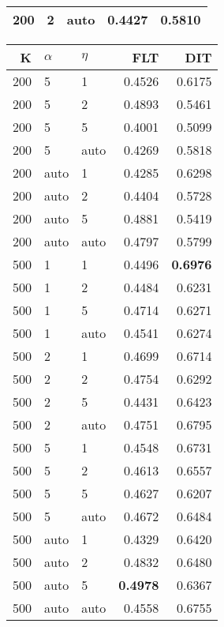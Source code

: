 \begin{table}
\begin{spacing}{1.2}
{\begin{tabular}{rll|rr}
 200 &     2 &  auto &           0.4427 & 0.5810 \\
\bottomrule
\end{tabular}
} \hfill \parbox{.45\linewidth}{\centering \begin{tabular}{rll|rr}
\toprule
   K & $\alpha$ &   $\eta$ & FLT &       DIT \\
\midrule
 200 &     5 &     1 &           0.4526 &       0.6175 \\
 200 &     5 &     2 &           0.4893 &       0.5461 \\
 200 &     5 &     5 &           0.4001 &       0.5099 \\
 200 &     5 &  auto &           0.4269 &       0.5818 \\
 200 &  auto &     1 &           0.4285 &       0.6298 \\
 200 &  auto &     2 &           0.4404 &       0.5728 \\
 200 &  auto &     5 &           0.4881 &       0.5419 \\
 200 &  auto &  auto &           0.4797 &       0.5799 \\
 500 &     1 &     1 &           0.4496 & {\bf 0.6976} \\
 500 &     1 &     2 &           0.4484 &       0.6231 \\
 500 &     1 &     5 &           0.4714 &       0.6271 \\
 500 &     1 &  auto &           0.4541 &       0.6274 \\
 500 &     2 &     1 &           0.4699 &       0.6714 \\
 500 &     2 &     2 &           0.4754 &       0.6292 \\
 500 &     2 &     5 &           0.4431 &       0.6423 \\
 500 &     2 &  auto &           0.4751 &       0.6795 \\
 500 &     5 &     1 &           0.4548 &       0.6731 \\
 500 &     5 &     2 &           0.4613 &       0.6557 \\
 500 &     5 &     5 &           0.4627 &       0.6207 \\
 500 &     5 &  auto &           0.4672 &       0.6484 \\
 500 &  auto &     1 &           0.4329 &       0.6420 \\
 500 &  auto &     2 &           0.4832 &       0.6480 \\
 500 &  auto &     5 &     {\bf 0.4978} &       0.6367 \\
 500 &  auto &  auto &           0.4558 &       0.6755 \\
\bottomrule
\end{tabular}
}
\end{spacing}
\end{table}
